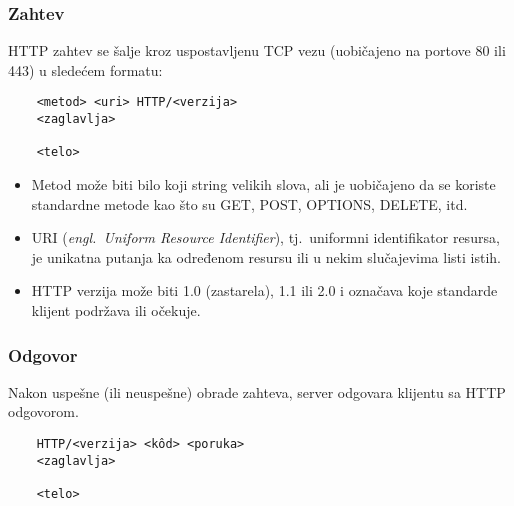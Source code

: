 \documentclass[12pt]{report}
\begin{document}
\subsubsection{Zahtev}
\acrshort{HTTP} zahtev se šalje kroz uspostavljenu \acrshort{TCP} vezu (uobičajeno na portove 80 ili 443) u sledećem formatu:
\begin{samepage}
    \begin{verbatim}
    <metod> <uri> HTTP/<verzija>
    <zaglavlja>

    <telo>
    \end{verbatim}
\end{samepage}

\begin{itemize}
    \item Metod može biti bilo koji string velikih slova, ali je uobičajeno da se koriste standardne metode kao što su GET, POST, OPTIONS, DELETE, itd.
    \item URI (\textit{engl.\ Uniform Resource Identifier}), tj.\ uniformni identifikator resursa, je unikatna putanja ka određenom resursu ili u nekim slučajevima listi istih.
    \item \acrshort{HTTP} verzija može biti 1.0 (zastarela), 1.1 ili 2.0 i označava koje standarde klijent podržava ili očekuje.
\end{itemize}

\subsubsection{Odgovor}
Nakon uspešne (ili neuspešne) obrade zahteva, server odgovara klijentu sa \acrshort{HTTP} odgovorom.
\begin{samepage}
    \begin{verbatim}
    HTTP/<verzija> <kôd> <poruka>
    <zaglavlja>

    <telo>
    \end{verbatim}
\end{samepage}
\end{document}

